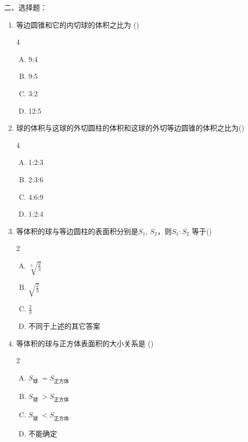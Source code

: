 二、选择题：
\begin{enumerate}
    \item 等边圆锥和它的内切球的体积之比为 \hfill (\qquad )
\begin{multicols}{4}
\begin{enumerate}[(A)]
    \item 9:4
    \item 9:5
    \item 3:2
    \item 12:5
\end{enumerate}
\end{multicols}

\item 球的体积与这球的外切圆柱的体积和这球的外切等边圆锥的体积之比为\hfill (\qquad )
\begin{multicols}{4}
\begin{enumerate}[(A)]
    \item 1:2:3
    \item 2:3:6
    \item 4:6:9
    \item 1:2:4
\end{enumerate}
\end{multicols}

\item 等体积的球与等边圆柱的表面积分别是$S_{1}$, $S_{2}$，则$S_{1}:S_{2}$ 等于\hfill (\qquad )
\begin{multicols}{2}
\begin{enumerate}[(A)]
    \item $\sqrt[3]{\frac{2}{3}}$
    \item $\sqrt{\frac{2}{3}}$
    \item $\frac{2}{3}$
    \item 不同于上述的其它答案
\end{enumerate}
\end{multicols}

\item 等体积的球与正方体表面积的大小关系是 \hfill (\qquad )
\begin{multicols}{2}
\begin{enumerate}[(A)]
    \item $S_{\text{球 }}=S_{\text{正方体 }}$
    \item $S_{\text{球 }}>S_{\text{正方体 }}$
    \item $S_{\text{球 }}<S_{\text{正方体 }}$
    \item 不能确定
\end{enumerate}
\end{multicols}



\end{enumerate}
